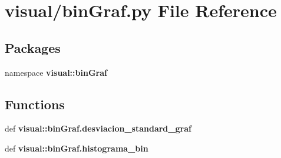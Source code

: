 \section{visual/bin\-Graf.py \-File \-Reference}
\label{bin_graf_8py}
\subsection*{\-Packages}
\begin{DoxyCompactItemize}
\item 
namespace {\bf visual\-::bin\-Graf}
\end{DoxyCompactItemize}
\subsection*{\-Functions}
\begin{DoxyCompactItemize}
\item 
def {\bf visual\-::bin\-Graf.\-desviacion\-\_\-standard\-\_\-graf}
\item 
def {\bf visual\-::bin\-Graf.\-histograma\-\_\-bin}
\end{DoxyCompactItemize}
